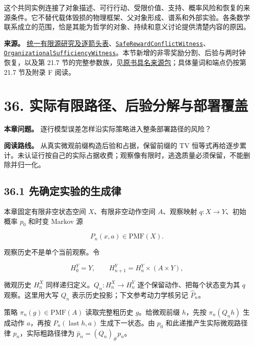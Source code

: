 \documentclass[
  11pt,
  oneside]{book}
\begin{document}
这个共同实例连接了对象描述、可行行动、受限价值、支持、概率风险和恢复的来源条件。它不替代载体毁损的物理框架、父对象形成、谱系和外部实验。各条数学联系成立的范围，恰是其能为哲学的对象、持续和意义讨论提供清楚内容的原因。

\textbf{来源。} \href{../formalization/ueot-core/docs/compression/theory_completion/unified_closure/interface_research_v1/UNIFIED_FINITE_SOURCE_EXAMPLE.md}{统一有限源研究及逐箭头表}、\href{../formalization/ueot-core/UEOT/V3/Compression/TheoryCompletion/UnifiedClosure/SafeRewardConflictWitness.lean}{\nolinkurl{SafeRewardConflictWitness}}、\href{../formalization/ueot-core/UEOT/V3/Compression/TheoryCompletion/UnifiedClosure/OrganizationalSufficiencyWitness.lean}{\nolinkurl{OrganizationalSufficiencyWitness}}。本节新增的非零奖励分割、后验与两时钟恢复，以及第 21.7 节的完整参数族，见\href{../formalization/ueot-core/docs/compression/theory_completion/unified_closure/conflict_family_book_source_v1/RESULTS_AND_OPEN_OBLIGATIONS.md}{原书具名来源包}；具体量词和端点仍按第 21.7 节及附录 F 阅读。

\chapter{36. 实际有限路径、后验分解与部署覆盖}\label{ch-36}

\textbf{本章问题。} 逐行模型误差怎样沿实际策略进入整条部署路径的风险？

\textbf{阅读路线。} 从真实微观前缀构造后验和占据，保留前缀的 TV 恒等式再给逐步累计。未认证行按自己的实际占据收费；观察像有限时，逃逸质量必须保留，不能删除并归一化。

\section{36.1 先确定实验的生成律}\label{ux5148ux786eux5b9aux5b9eux9a8cux7684ux751fux6210ux5f8b}

本章固定有限非空状态空间 \(X\)、有限非空动作空间 \(A\)、观察映射 \(q:X\to Y\)、初始概率 \(p_0\) 和时变 Markov 源

\[P_n(x,a)\in\mathrm{PMF}(X).\]

观察历史不是单个当前观察。令

\[H_0^Y=Y,\qquad H_{n+1}^Y=H_n^Y\times(A\times Y),\]

微观历史 \(H_n^X\) 同样递归定义。\(Q_n:H_n^X\to H_n^Y\) 逐个保留动作、把每个状态变为其 \(q\) 观察。这里用大写 \(Q_n\) 表示历史投影；下文参考动力学核另记 \(\widehat P_n\)。

策略 \(\pi_n(g)\in\mathrm{PMF}(A)\) 读取完整粗历史 \(g\)。给微观前缀 \(h\)，先按 \(\pi_n(Q_nh)\) 生成动作 \(a\)，再按 \(P_n(\operatorname{last}h,a)\) 生成下一状态。由 \(p_0\) 和此递推产生实际微观路径律 \(p_n\)，实际粗路径律为 \(\bar p_n=(Q_n)_\#p_n\)。
\end{document}
